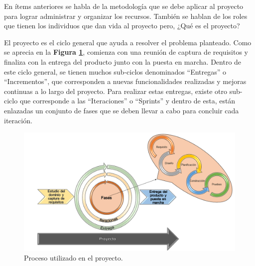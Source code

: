 En ítems anteriores se habla de la metodología que se debe aplicar al proyecto para lograr administrar y organizar los recursos. También se hablan de los roles que tienen los individuos que dan vida al proyecto pero, ¿Qué es el proyecto?

El proyecto es el ciclo general que ayuda a resolver el problema planteado. Como se aprecia en la \textbf{Figura \ref{fig: Proceso_Proyecto}}, comienza con una reunión de captura de requisitos y finaliza con la entrega del producto junto con la puesta en marcha. Dentro de este ciclo general, se tienen muchos sub-ciclos denominados ``Entregas'' o ``Incrementos'', que corresponden a nuevas funcionalidades realizadas y mejoras continuas a lo largo del proyecto. Para realizar estas entregas, existe otro sub-ciclo que corresponde a las ``Iteraciones'' o ``Sprints'' y dentro de esta, están enlazadas un conjunto de fases que se deben llevar a cabo para concluir cada iteración.

\begin{figure}[!htbp]
    \hspace{-9mm}
    \includegraphics[width=1.1\textwidth]{Imagenes/Proceso_Proyecto.png}
    \caption{\label{fig: Proceso_Proyecto}Proceso utilizado en el proyecto.}
\end{figure}